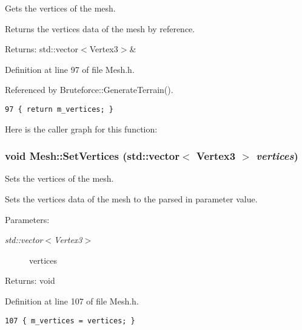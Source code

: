 Gets the vertices of the mesh. 

Returns the vertices data of the mesh by reference.

\begin{Desc}
\item[Returns:]std::vector$<$Vertex3$>$\& \end{Desc}


Definition at line 97 of file Mesh.h.

Referenced by Bruteforce::GenerateTerrain().

\begin{Code}\begin{verbatim}97 { return m_vertices; }
\end{verbatim}
\end{Code}




Here is the caller graph for this function:\hypertarget{class_mesh_9f9d573f88176edf6a883ee5da35ab06}{
\subsubsection[SetVertices]{\setlength{\rightskip}{0pt plus 5cm}void Mesh::SetVertices (std::vector$<$ Vertex3 $>$ {\em vertices})}}
\label{class_mesh_9f9d573f88176edf6a883ee5da35ab06}


Sets the vertices of the mesh. 

Sets the vertices data of the mesh to the parsed in parameter value.

\begin{Desc}
\item[Parameters:]
\begin{description}
\item[{\em std::vector$<$Vertex3$>$}]vertices \end{description}
\end{Desc}
\begin{Desc}
\item[Returns:]void \end{Desc}


Definition at line 107 of file Mesh.h.

\begin{Code}\begin{verbatim}107 { m_vertices = vertices; }
\end{verbatim}
\end{Code}


